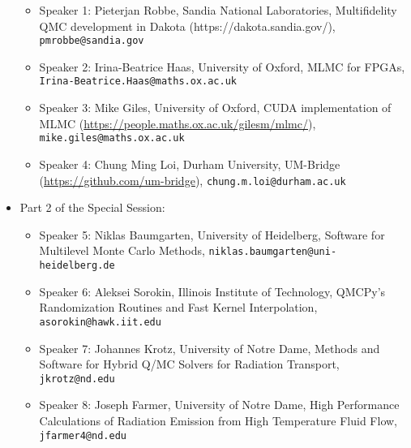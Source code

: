 \begin{session}
\begin{itemize}
 \begin{itemize}
 \item Speaker 1: Pieterjan Robbe, Sandia National Laboratories, Multifidelity QMC development in Dakota (https://dakota.sandia.gov/), \texttt{pmrobbe@sandia.gov}
 \item Speaker 2: Irina-Beatrice Haas, University of Oxford,  MLMC for FPGAs, \newline \texttt{Irina-Beatrice.Haas@maths.ox.ac.uk}
 \item Speaker 3: Mike Giles, University of Oxford, CUDA implementation of MLMC (\url{https://people.maths.ox.ac.uk/gilesm/mlmc/}), \texttt{mike.giles@maths.ox.ac.uk}
 \item Speaker 4: Chung Ming Loi,  Durham University, UM-Bridge (\url{https://github.com/um-bridge}), \texttt{chung.m.loi@durham.ac.uk} %
 \end{itemize}
 \item Part 2 of the Special Session:
 \begin{itemize}
 \item Speaker 5:  Niklas Baumgarten, University of Heidelberg, Software for Multilevel Monte Carlo Methods, \texttt{niklas.baumgarten@uni-heidelberg.de}
 \item Speaker 6: Aleksei Sorokin,  Illinois Institute of Technology, QMCPy's Randomization Routines and Fast Kernel Interpolation, \texttt{asorokin@hawk.iit.edu}
 \item Speaker 7:  Johannes Krotz, University of Notre Dame, Methods and Software for Hybrid Q/MC Solvers for Radiation Transport, \texttt{jkrotz@nd.edu} %
 \item Speaker 8: Joseph Farmer, University of Notre Dame, High Performance Calculations of Radiation Emission from High Temperature Fluid Flow, \texttt{jfarmer4@nd.edu} %
 \end{itemize}
 \end{itemize}
 \medskip
 \begin{comment}
 If you would like to include references, please do so by creating a simple list numbered by [1], [2], [3], \ldots. See example below.
 Please do not use the \texttt{bibliography} environment or \texttt{bibtex} files.
 \begin{enumerate}
 \item[{[1]}] Niederreiter, Harald (1992). {\it Random number generation and quasi-Monte Carlo methods}. Society for Industrial and Applied Mathematics (SIAM).
 \item[{[2]}] Roberts, Gareth O, \& Rosenthal, Jeffrey S. (2002).  Optimal scaling for various Metropolis-Hastings algorithms, \textbf{16}(4), 351--367.
 \end{enumerate}
 Equations may be used if they are referenced. Please note that the equation numbers may be different (but will be cross-referenced correctly) in the final program book.
 \end{comment}
\end{session}

